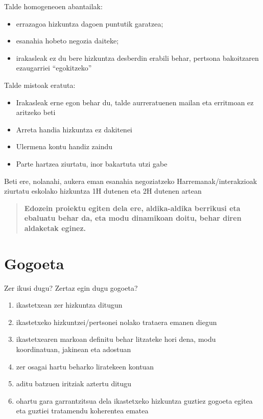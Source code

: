 \documentclass[
]{book}
\providecommand{\tightlist}{%
  \setlength{\itemsep}{0pt}\setlength{\parskip}{0pt}}
\begin{document}
Talde homogeneoen abantailak:

\begin{itemize}
\tightlist
\item
  errazagoa hizkuntza dagoen puntutik garatzea;
\item
  esanahia hobeto negozia daiteke;
\item
  irakasleak ez du bere hizkuntza desberdin erabili behar, pertsona bakoitzaren ezaugarriei ``egokitzeko''
\end{itemize}

Talde mistoak eratuta:

\begin{itemize}
\tightlist
\item
  Irakasleak erne egon behar du, talde aurreratuenen mailan eta erritmoan ez aritzeko beti
\item
  Arreta handia hizkuntza ez dakitenei
\item
  Ulermena kontu handiz zaindu
\item
  Parte hartzea ziurtatu, inor bakartuta utzi gabe
\end{itemize}

Beti ere, nolanahi, aukera eman esanahia negoziatzeko
Harremanak/interakzioak ziurtatu eskolako hizkuntza 1H dutenen eta 2H dutenen artean

\begin{quote}
\textbf{Edozein proiektu egiten dela ere, aldika-aldika berrikusi eta ebaluatu behar da, eta modu dinamikoan doitu, behar diren aldaketak eginez.}
\end{quote}

\hypertarget{gogoeta}{%
\section{Gogoeta}\label{gogoeta}}

Zer ikusi dugu? Zertaz egin dugu gogoeta?

\begin{enumerate}
\def\labelenumi{\arabic{enumi}.}
\tightlist
\item
  ikastetxean zer hizkuntza ditugun
\item
  ikastetxeko hizkuntzei/pertsonei nolako trataera emanen diegun
\item
  ikastetxearen markoan definitu behar litzateke hori dena, modu koordinatuan, jakinean eta adostuan
\item
  zer osagai hartu beharko liratekeen kontuan
\item
  aditu batzuen iritziak aztertu ditugu
\item
  ohartu gara garrantzitsua dela ikastetxeko hizkuntza guztiez gogoeta egitea eta guztiei tratamendu koherentea ematea
\end{enumerate}
\end{document}
